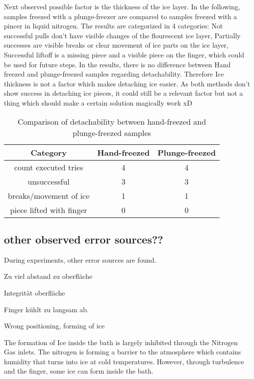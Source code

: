 Next observed possible factor is the thickness of the ice layer. In the following, samples freezed with a plunge-freezer are compared to samples freezed with a pincer in liquid nitrogen. The results are categorized in 4 categories: Not successful pulls don't have visible changes of the flourescent ice layer, Partially successes are visible breaks or clear movement of ice parts on the ice layer, Successful liftoff is a missing piece and a visible piece on the finger, which could be used for future steps. In the results, there is no difference between Hand freezed and plunge-freezed samples regarding detachability. Therefore Ice thickness is not a factor which makes detaching ice easier. As both methods don't show success in detaching ice pieces, it could still be a relevant factor but not a thing which should make a certain solution magically work xD

\begin{table}
	\centering
	\begin{tabular}{|c|c|c|}
		\hline
		Category & Hand-freezed & Plunge-freezed \\
		\hline
		\hline
		count executed tries & 4 & 4\\
		\hline
		unsuccessful & 3 & 3\\
		\hline
		breaks/movement of ice & 1 & 1\\
		\hline
		piece lifted with finger & 0 & 0\\
		\hline		
	\end{tabular}
	\caption{Comparison of detachability between hand-freezed and plunge-freezed samples}
\end{table}

\subsection{other observed error sources??}

During experiments, other error sources are found. 

Zu viel abstand zu oberfläche

Integrität oberfläche

Finger kühlt zu langsam ab.

Wrong positioning, forming of ice

The formation of Ice inside the bath is largely inhibited through the Nitrogen Gas inlets. The nitrogen is forming a barrier to the atmosphere which contains humidity that turns into ice at cold temperatures. However, through turbulence and the finger, some ice can form inside the bath. 

